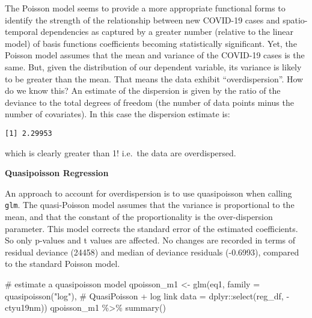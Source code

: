 \documentclass[
  letterpaper,
  krantz2]{style/krantz}
\newenvironment{Shaded}{\begin{snugshade}}{\end{snugshade}}
\newcommand{\AttributeTok}[1]{\textcolor[rgb]{0.40,0.45,0.13}{#1}}
\newcommand{\CommentTok}[1]{\textcolor[rgb]{0.37,0.37,0.37}{#1}}
\newcommand{\FunctionTok}[1]{\textcolor[rgb]{0.28,0.35,0.67}{#1}}
\newcommand{\NormalTok}[1]{\textcolor[rgb]{0.00,0.23,0.31}{#1}}
\newcommand{\OtherTok}[1]{\textcolor[rgb]{0.00,0.23,0.31}{#1}}
\newcommand{\SpecialCharTok}[1]{\textcolor[rgb]{0.37,0.37,0.37}{#1}}
\newcommand{\StringTok}[1]{\textcolor[rgb]{0.13,0.47,0.30}{#1}}
\begin{document}
The Poisson model seems to provide a more appropriate functional forms
to identify the strength of the relationship between new COVID-19 cases
and spatio-temporal dependencies as captured by a greater number
(relative to the linear model) of basis functions coefficients becoming
statistically significant. Yet, the Poisson model assumes that the mean
and variance of the COVID-19 cases is the same. But, given the
distribution of our dependent variable, its variance is likely to be
greater than the mean. That means the data exhibit ``overdispersion''.
How do we know this? An estimate of the dispersion is given by the ratio
of the deviance to the total degrees of freedom (the number of data
points minus the number of covariates). In this case the dispersion
estimate is:

\begin{Shaded}
\end{Shaded}

\begin{verbatim}
[1] 2.29953
\end{verbatim}

which is clearly greater than 1! i.e.~the data are overdispersed.

\textbf{Quasipoisson Regression}

An approach to account for overdispersion is to use quasipoisson when
calling \texttt{glm}. The quasi-Poisson model assumes that the variance
is proportional to the mean, and that the constant of the
proportionality is the over-dispersion parameter. This model corrects
the standard error of the estimated coefficients. So only p-values and t
values are affected. No changes are recorded in terms of residual
deviance (24458) and median of deviance residuals (-0.6993), compared to
the standard Poisson model.

\begin{Shaded}
\begin{Highlighting}[]
\CommentTok{\# estimate a quasipoisson model}
\NormalTok{qpoisson\_m1 }\OtherTok{\textless{}{-}} \FunctionTok{glm}\NormalTok{(eq1,}
                \AttributeTok{family =} \FunctionTok{quasipoisson}\NormalTok{(}\StringTok{"log"}\NormalTok{), }\CommentTok{\# QuasiPoisson + log link}
                \AttributeTok{data =}\NormalTok{ dplyr}\SpecialCharTok{::}\FunctionTok{select}\NormalTok{(reg\_df, }\SpecialCharTok{{-}}\NormalTok{ctyu19nm))}
\NormalTok{qpoisson\_m1 }\SpecialCharTok{\%\textgreater{}\%} \FunctionTok{summary}\NormalTok{()}
\end{Highlighting}
\end{Shaded}
\end{document}
